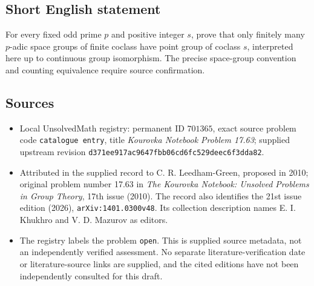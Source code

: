 \documentclass[11pt]{article}
\begin{document}
\subsection{Short English statement}
For every fixed odd prime \(p\) and positive integer \(s\), prove that only finitely many \(p\)-adic space groups of finite coclass have point group of coclass \(s\), interpreted here up to continuous group isomorphism. The precise space-group convention and counting equivalence require source confirmation.
\subsection{Sources}
\begin{itemize}
\item Local UnsolvedMath registry: permanent ID \(701365\), exact source problem code \texttt{catalogue entry}, title \emph{Kourovka Notebook Problem 17.63}; supplied upstream revision \texttt{d371ee917ac9647fbb06cd6fc529deec6f3dda82}.
\item Attributed in the supplied record to C. R. Leedham-Green, proposed in 2010; original problem number 17.63 in \emph{The Kourovka Notebook: Unsolved Problems in Group Theory}, 17th issue (2010). The record also identifies the 21st issue edition (2026), \texttt{arXiv:1401.0300v48}. Its collection description names E. I. Khukhro and V. D. Mazurov as editors.
\item The registry labels the problem \texttt{open}. This is supplied source metadata, not an independently verified assessment. No separate literature-verification date or literature-source links are supplied, and the cited editions have not been independently consulted for this draft.
\end{itemize}
\end{document}
